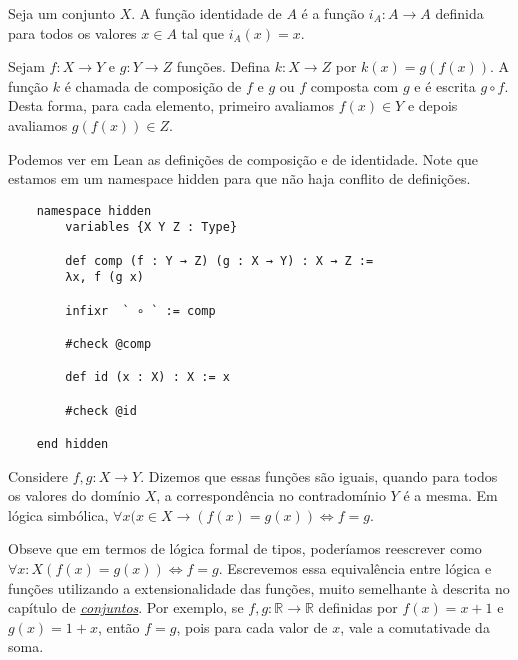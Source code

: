 \theoremstyle{definition}
\newtheorem{example}{Exemplo}[section]

\theoremstyle{plain}
\newtheorem{theorem}{Proposição}[section]

\theoremstyle{plain}
\newtheorem{corollary}{Corolário}[section]

\begin{definition}
    \label{def1}
    Seja um conjunto $X$. A função identidade de $A$ é a função 
    $i_A : A \rightarrow A$ definida para todos os valores $x \in A$ tal que $i_A(x) = x$.
\end{definition}

\begin{definition}
    \label{def2}
    Sejam $f : X \rightarrow Y$ e $g : Y \rightarrow Z$ funções. 
    Defina $k : X \rightarrow Z$ por $k(x) = g(f(x))$. A função $k$ é chamada de composição
    de $f$ e $g$ ou $f$ composta com $g$ e é escrita $g \circ f$. Desta forma, para cada elemento, 
    primeiro  avaliamos $f(x) \in Y$ e depois avaliamos $g(f(x)) \in Z$. 
\end{definition}

Podemos ver em Lean as definições de composição e de identidade. Note que estamos em um namespace 
hidden para que não haja conflito de definições. 

\begin{lstlisting}
    namespace hidden
        variables {X Y Z : Type}

        def comp (f : Y → Z) (g : X → Y) : X → Z :=
        λx, f (g x)

        infixr  ` ∘ ` := comp

        #check @comp

        def id (x : X) : X := x

        #check @id
        
    end hidden
\end{lstlisting}

\begin{definition}
    \label{def3}
    Considere $f,g : X \to Y$. Dizemos que essas funções são iguais, 
    quando para todos os valores do domínio $X$, a correspondência no contradomínio $Y$ é a 
    mesma. Em lógica simbólica, $\forall x (x \in X \to (f(x) = g(x)) \iff f = g $. 
\end{definition}

Obseve que em termos de lógica formal de tipos, poderíamos reescrever como 
$\forall x : X (f(x) = g(x)) \iff f = g$. Escrevemos essa equivalência entre lógica e funções 
utilizando a extensionalidade das funções, muito semelhante à descrita no capítulo de 
\textit{\hyperlink{chapter.5}{conjuntos}}. Por exemplo, se $f, g : \mathbb{R} \to \mathbb{R}$ 
definidas por $f(x) = x + 1$ e $g(x) = 1 + x$, então $f = g$, pois para cada valor de $x$, vale 
a comutativade da soma. 

